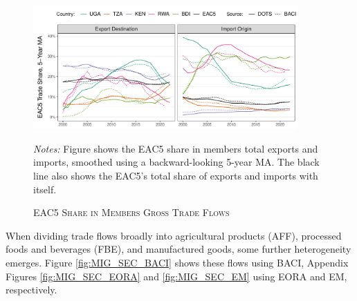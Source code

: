 \documentclass[a4paper]{article}
\begin{document}
\begin{figure}[h!] 
\centering
\caption{\label{fig:GTEACshares}\textsc{EAC5 Share in Members Gross Trade Flows}}
\includegraphics[width=0.9\textwidth, trim= {0 0 0 0}, clip]{"GT_EAC5_shares_ts.pdf"} \\ 
\raggedright
\scriptsize 
\emph{Notes:} Figure shows the EAC5 share in members total exports and imports, smoothed using a backward-looking 5-year MA. The black line also shows the EAC5's total share of exports and imports with itself.
\end{figure}
\FloatBarrier

When dividing trade flows broadly into agricultural products (AFF), processed foods and beverages (FBE), and manufactured goods, some further heterogeneity emerges. Figure \ref{fig:MIG_SEC_BACI} shows these flows using BACI, Appendix Figures \ref{fig:MIG_SEC_EORA} and \ref{fig:MIG_SEC_EM} using EORA and EM, respectively. \newline 
\end{document}
